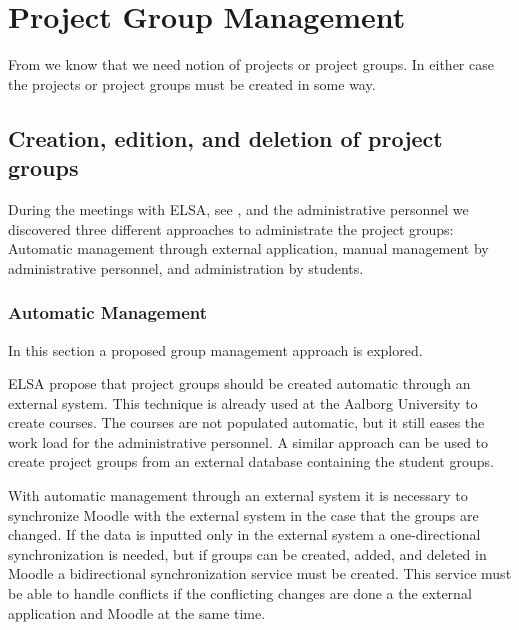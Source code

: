 \section{Project Group Management}
\label{sec:groupManagement}
From  we know that we need notion of projects or project groups. In either case the projects or project groups must be created in some way. 
\subsection{Creation, edition, and deletion of project groups} %
During the meetings with ELSA,  see , and the administrative personnel we discovered three different approaches to administrate the project groups: Automatic management through external application, manual management by administrative personnel, and administration by students. 


\subsubsection{Automatic Management}
In this section a proposed group management approach is explored.  

ELSA propose that project groups should be created automatic through an external system. 
This technique is already used at the Aalborg University to create courses. 
The courses are not populated automatic, but it still eases the work load for the administrative personnel.  
A similar approach can be used to create project groups from an external database containing the student groups. 

With automatic management through an external system it is necessary to synchronize Moodle with the external system in the case that the groups are changed. 
If the data is inputted only in the external system a one-directional synchronization is needed, but if groups can be created, added, and deleted in Moodle a bidirectional synchronization service must be created. 
This service must be able to handle conflicts if the conflicting changes are done a the external application and Moodle at the same time.

